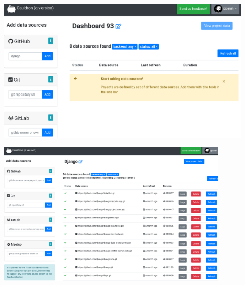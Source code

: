 \documentclass[17pt,aspectratio=169,hyperref=pdfusetitle]{beamer}
\begin{document}
\begin{frame}

\begin{center}
\includegraphics[height=7cm]{figs/cauldron-dashboard-start}
\end{center}

\end{frame}


\begin{frame}

\begin{center}
\includegraphics[height=7cm]{figs/cauldron-dashboard}
\end{center}

\end{frame}


\end{document}
